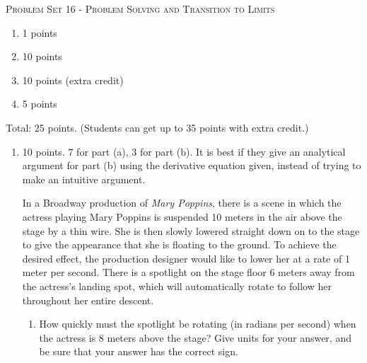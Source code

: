 \documentclass{article}
\begin{document}
\begin{center}
  \large\textsc{Problem Set 16 - Problem Solving and Transition to Limits}
\end{center}

\begin{grading}
    \begin{enumerate}
        \item 1 points
        \item 10 points
        \item 10 points (extra credit)
        \item 5 points
    \end{enumerate}
    Total: 25 points. (Students can get up to 35 points with extra credit.)
\end{grading}

\begin{enumerate}



\item 

\begin{grading}
  10 points. 7 for part (a), 3 for part (b). It is best if they give an analytical argument for part (b)  using the derivative equation given, instead of trying to make an intuitive argument.
\end{grading}

In a Broadway production of \emph{Mary Poppins}, there is a scene in which the actress playing Mary Poppins is suspended 10 meters in the air above the stage by a thin wire. She is then slowly lowered straight down on to the stage to give the appearance that she is floating to the ground. To achieve the desired effect, the production designer would like to lower her at a rate of 1 meter per second. There is a spotlight on the stage floor 6 meters away from the actress's landing spot, which will automatically rotate to follow her throughout her entire descent. 

\begin{enumerate}
\item How quickly must the spotlight be rotating (in radians per second) when the actress is 8 meters above the stage? Give units for your answer, and be sure that your answer has the correct sign.

 
\begin{solution} 


\begin{figure}[ht]
\centering
{}
\end{figure}
\end{solution}
\end{enumerate}
\end{enumerate}
\end{document}
